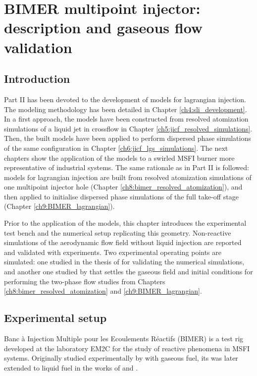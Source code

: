 \chapter{BIMER multipoint injector: description and gaseous flow validation}
	\label{ch7:bimer_test_bench_and_aero}

\section{Introduction}

Part II has been devoted to the development of models for lagrangian injection. The modeling methodology has been detailed in Chapter \ref{ch4:sli_development}. In a first approach, the models have been constructed from resolved atomization simulations of a liquid jet in crossflow in Chapter \ref{ch5:jicf_resolved_simulations}. Then, the built models have been applied to perform dispersed phase simulations of the same configuration in Chapter \ref{ch6:jicf_lgs_simulations}. The next chapters show the application of the models to a swirled MSFI burner more representative of industrial systems. The same rationale as in Part II is followed: models for lagrangian injection are built from resolved atomization simulations of one multipoint injector hole (Chapter \ref{ch8:bimer_resolved_atomization}), and then applied to initialise dispersed phase simulations of the full take-off stage (Chapter \ref{ch9:BIMER_lagrangian}). 

Prior to the application of the models, this chapter introduces the experimental test bench and the numerical setup replicating this geometry. Non-reactive simulations of the aerodynamic flow field without liquid injection are reported and validated with experiments. Two experimental operating points are simulated: one studied in the thesis of  for validating the numerical simulations, and another one studied by  that settles the gaseous field and initial conditions for performing the two-phase flow studies from Chapters \ref{ch8:bimer_resolved_atomization} and \ref{ch9:BIMER_lagrangian}.


\section{Experimental setup}

Banc à Injection Multiple pour les Ecoulements Réactifs (BIMER) is a test rig developed at the laboratory EM2C for the study of reactive phenomena in MSFI systems. Originally studied experimentally by  with gaseous fuel, its was later extended to liquid fuel in the works of  and .

